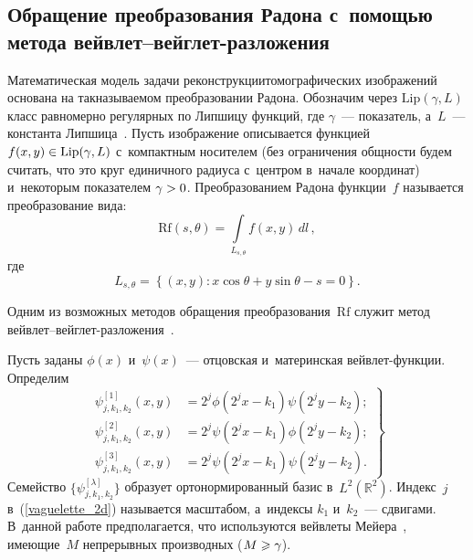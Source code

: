 \begin{multicols}{2}
 \vspace*{-6pt}

\section{Обращение преобразования Радона 
с~помощью метода вейвлет--вейглет-разложения}

Математическая модель задачи реконструкции\linebreak томографических 
изображений основана на так\linebreak называемом преобразовании Радона. 
Обозначим через $\mathrm{Lip}(\gamma,L)$ класс равномерно регулярных 
по Липшицу функций, где $\gamma$~--- показатель, а~$L$~--- 
константа Липшица~\cite{Mall99}. Пусть изображение описывается
 функцией $f(x,y)\hm\in\mathrm{Lip}(\gamma,L)$ с~компактным носителем 
 (без ограничения общности будем считать, что это круг единичного 
 радиуса с~центром в~начале координат) и~некоторым показателем $\gamma\hm>0$. 
 Преобразованием Радона функции~$f$ называется преобразование вида:
\begin{equation*}
\mathrm{Rf}\left(s,\theta\right) = \int\limits_{L_{s,\theta}} f(x,y)\, dl\,,
\end{equation*}
где
\begin{equation*}
L_{s,\theta} = \left\{(x,y)\colon x\cos\theta + y\sin\theta - s = 0 \right\}.
\end{equation*}

Одним из возможных методов обращения преобразования~$\mathrm{Rf}$ служит метод 
вейв\-лет--вейг\-лет-раз\-ло\-же\-ния~\cite{D94}.

Пусть заданы $\phi(x)$ и~$\psi(x)$~--- отцовская и~материнская вейв\-лет-функ\-ции.
Определим
\begin{equation}
\left.
\begin{array}{rl}
\psi_{j,k_1,k_2}^{[1]} (x,y) &= 2^j \phi\left(2^j x - k_1\right) \psi\left(2^j y - k_2\right);\\[6pt]
\psi_{j,k_1,k_2}^{[2]} (x,y) &= 2^j \psi\left(2^j x - k_1\right) \phi\left(2^j y - k_2\right);\\[6pt]
\psi_{j,k_1,k_2}^{[3]} (x,y) &= 2^j \psi\left(2^j x - k_1\right) \psi\left(2^j y - k_2\right).
\end{array}
\right\}
\label{vaguelette_2d}
\end{equation}
Семейство $\{\psi^{[\lambda]}_{j,k_1,k_2}\}$
образует ортонормированный базис в~$L^2(\mathbb{R}^2)$. Индекс~$j$ 
в~(\ref{vaguelette_2d}) называется масштабом, а~индексы $k_1$ и~$k_2$~---
сдвигами. В~данной работе предполагается, что используются вейвлеты 
Мейера~\cite{Mall99}, имеющие~$M$ непрерывных производных ($M\hm\geqslant\gamma$).


\end{multicols}
